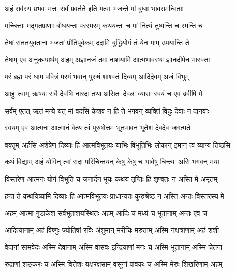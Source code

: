 \twolineshloka
{अहं सर्वस्य प्रभवः मत्तः सर्वं प्रवर्तते}
{इति मत्वा भजन्ते मां बुधाः भावसमन्विताः}%

\twolineshloka
{मच्चित्ताः मद्गतप्राणाः बोधयन्तः परस्परम्}
{कथयन्तः च मां नित्यं तुष्यन्ति च रमन्ति च}%

\twolineshloka
{तेषां सततयुक्तानां भजतां प्रीतिपूर्वकम्}
{ददामि बुद्धियोगं तं येन माम् उपयान्ति ते}%

\twolineshloka
{तेषाम् एव अनुकम्पार्थम् अहम् अज्ञानजं तमः}
{नाशयामि आत्मभावस्थः ज्ञानदीपेन भास्वता}%


\twolineshloka
{परं ब्रह्म परं धाम पवित्रं परमं भवान्}
{पुरुषं शाश्वतं दिव्यम् आदिदेवम् अजं विभुम्}%

\twolineshloka
{आहुः त्वाम् ऋषयः सर्वे देवर्षिः नारदः तथा}
{असितः देवलः व्यासः स्वयं च एव ब्रवीषि मे}%

\twolineshloka
{सर्वम् एतत् ऋतं मन्ये यत् मां वदसि केशव}
{न हि ते भगवन् व्यक्तिं विदुः देवाः न दानवाः}%

\twolineshloka
{स्वयम् एव आत्मना आत्मानं वेत्थ त्वं पुरुषोत्तम}
{भूतभावन भूतेश देवदेव जगत्पते}%

\twolineshloka
{वक्तुम् अर्हसि अशेषेण दिव्याः हि आत्मविभूतयः}
{याभिः विभूतिभिः लोकान् इमान् त्वं व्याप्य तिष्ठसि}%

\twolineshloka
{कथं विद्याम् अहं योगिन् त्वां सदा परिचिन्तयन्}
{केषु केषु च भावेषु चिन्त्यः असि भगवन् मया}%

\twolineshloka
{विस्तरेण आत्मनः योगं विभूतिं च जनार्दन}
{भूयः कथय तृप्तिः हि शृण्वतः न अस्ति मे अमृतम्}%


\twolineshloka
{हन्त ते कथयिष्यामि दिव्याः हि आत्मविभूतयः}
{प्राधान्यतः कुरुश्रेष्ठ न अस्ति अन्तः विस्तरस्य मे}%

\twolineshloka
{अहम् आत्मा गुडाकेश सर्वभूताशयस्थितः}
{अहम् आदिः च मध्यं च भूतानाम् अन्तः एव च}%

\twolineshloka
{आदित्यानाम् अहं विष्णुः ज्योतिषां रविः अंशुमान्}
{मरीचिः मरुताम् अस्मि नक्षत्राणाम् अहं शशी}%

\twolineshloka
{वेदानां सामवेदः अस्मि देवानाम् अस्मि वासवः}
{इन्द्रियाणां मनः च अस्मि भूतानाम् अस्मि चेतना}%

\twolineshloka
{रुद्राणां शङ्करः च अस्मि वित्तेशः यक्षरक्षसाम्}
{वसूनां पावकः च अस्मि मेरुः शिखरिणाम् अहम्}%

